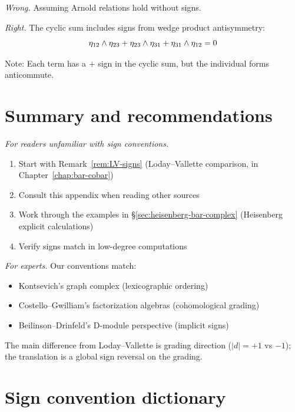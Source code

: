 \emph{Wrong.} Assuming Arnold relations hold without signs.

\emph{Right.} The cyclic sum includes signs from wedge product antisymmetry:
\[\eta_{12} \wedge \eta_{23} + \eta_{23} \wedge \eta_{31} + \eta_{31} \wedge \eta_{12} = 0\]

Note: Each term has a $+$ sign in the cyclic sum, but the individual forms anticommute.

\section{Summary and recommendations}

\emph{For readers unfamiliar with sign conventions.}
\begin{enumerate}
\item Start with Remark~\ref{rem:LV-signs} (Loday--Vallette comparison, in Chapter~\ref{chap:bar-cobar})
\item Consult this appendix when reading other sources
\item Work through the examples in \S\ref{sec:heisenberg-bar-complex} (Heisenberg explicit calculations)
\item Verify signs match in low-degree computations
\end{enumerate}

\emph{For experts.}
Our conventions match:
\begin{itemize}
\item Kontsevich's graph complex (lexicographic ordering)
\item Costello--Gwilliam's factorization algebras (cohomological grading)
\item Beilinson--Drinfeld's D-module perspective (implicit signs)
\end{itemize}

The main difference from Loday--Vallette is grading direction ($|d| = +1$ vs $-1$); the translation is a global sign reversal on the grading.

\section{Sign convention dictionary}
\label{sec:sign-dictionary-complete}

